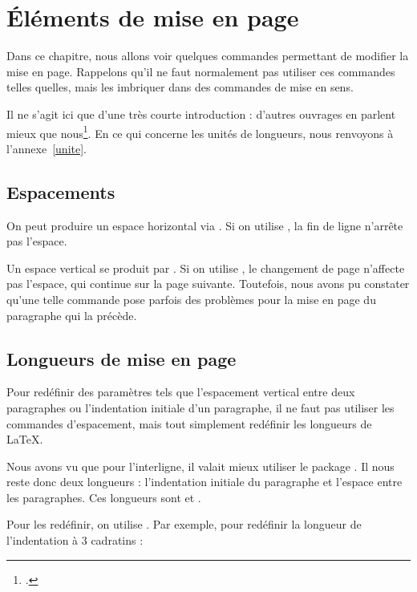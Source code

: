 \chapter{Éléments de mise en page}\label{espacement}

\begin{intro}
Dans ce chapitre, nous allons voir quelques commandes permettant de modifier la mise en page.
Rappelons qu'il ne faut normalement pas utiliser ces commandes telles quelles, mais les imbriquer dans des commandes de mise en sens.

Il ne s'agit ici que d'une très courte introduction : d'autres ouvrages en parlent mieux que nous\footcites(En particulier)(){frama}{latex_graphic_companion}.
En ce qui concerne les unités de longueurs, nous renvoyons à l'annexe~\ref{unite}.
\end{intro}

\section{Espacements}\label{espace}

On peut produire un espace horizontal via . Si on utilise , la fin de ligne n'arrête pas l'espace.

Un espace vertical se produit par . Si on utilise , le changement de page n'affecte pas  l'espace, qui continue sur la page suivante. Toutefois, nous avons pu constater qu'une telle commande pose parfois des problèmes pour la mise en page du paragraphe qui la précède.



\section{Longueurs de mise en page}

Pour redéfinir des paramètres tels que l'espacement vertical entre deux paragraphes ou l'indentation initiale d'un paragraphe, il ne faut pas utiliser les commandes d'espacement, mais tout simplement redéfinir les longueurs de \LaTeX.

Nous avons vu que pour l'interligne, il valait mieux utiliser le package . Il nous reste donc deux longueurs : l'indentation initiale du paragraphe et l'espace entre les paragraphes. Ces longueurs sont  et .

Pour les redéfinir, on utilise . Par exemple, pour redéfinir la longueur de l'indentation à 3 cadratins :\label{setlength}

